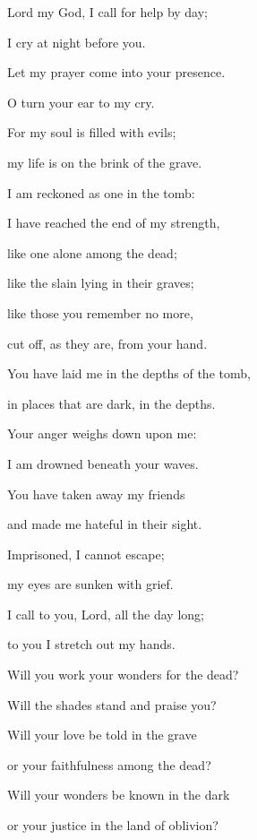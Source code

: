\noindent Lord my God, I call for help by day;~\GreStar{}~\nopagebreak

I cry at night before you.

\noindent Let my prayer come into your presence.~\GreStar{}~\nopagebreak

O turn your ear to my cry.

\noindent For my soul is filled with evils;~\GreStar{}~\nopagebreak

my life is on the brink of the grave.

\noindent I am reckoned as one in the tomb:~\GreStar{}~\nopagebreak

I have reached the end of my strength,

\noindent like one alone among the dead;~\GreStar{}~\nopagebreak

like the slain lying in their graves;

\noindent like those you remember no more,~\GreStar{}~\nopagebreak

cut off, as they are, from your hand.

\noindent You have laid me in the depths of the tomb,~\GreStar{}~\nopagebreak

in places that are dark, in the depths.

\noindent Your anger weighs down upon me:~\GreStar{}~\nopagebreak

I am drowned beneath your waves.

\noindent You have taken away my friends~\GreStar{}~\nopagebreak

and made me hateful in their sight.

\noindent Imprisoned, I cannot escape;~\GreStar{}~\nopagebreak

my eyes are sunken with grief.

\noindent I call to you, Lord, all the day long;~\GreStar{}~\nopagebreak

to you I stretch out my hands.

\noindent Will you work your wonders for the dead?~\GreStar{}~\nopagebreak

Will the shades stand and praise you?

\noindent Will your love be told in the grave~\GreStar{}~\nopagebreak

or your faithfulness among the dead?

\noindent Will your wonders be known in the dark~\GreStar{}~\nopagebreak

or your justice in the land of oblivion?


